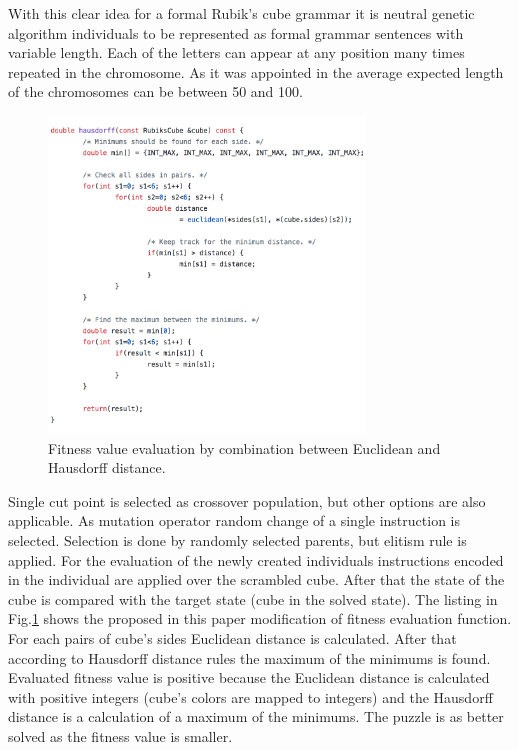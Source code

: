\documentclass[runningheads]{llncs}
\begin{document}
With this clear idea for a formal Rubik's cube grammar it is neutral genetic algorithm individuals to be represented as formal grammar sentences with variable length. Each of the letters can appear at any position many times repeated in the chromosome. As it was appointed in \cite{korf01} the average expected length of the chromosomes can be between 50 and 100.

\begin{figure}
\includegraphics[width=0.75\textwidth]{fig01.png}
\centering
\caption{Fitness value evaluation by combination between Euclidean and Hausdorff distance.} \label{fig01}
\end{figure}
\FloatBarrier

Single cut point is selected as crossover population, but other options \cite{poli01} are also applicable. As mutation operator random change of a single instruction is selected. Selection is done by randomly selected parents, but elitism rule is applied. For the evaluation of the newly created individuals instructions encoded in the individual are applied over the scrambled cube. After that the state of the cube is compared with the target state (cube in the solved state). The listing in Fig.\ref{fig01} shows the proposed in this paper modification of fitness evaluation function. For each pairs of cube's sides Euclidean distance is calculated. After that according to Hausdorff distance rules the maximum of the minimums is found. Evaluated fitness value is positive because the Euclidean distance is calculated with positive integers (cube's colors are mapped to integers) and the Hausdorff distance is a calculation of a maximum of the minimums. The puzzle is as better solved as the fitness value is smaller. 
\end{document}
